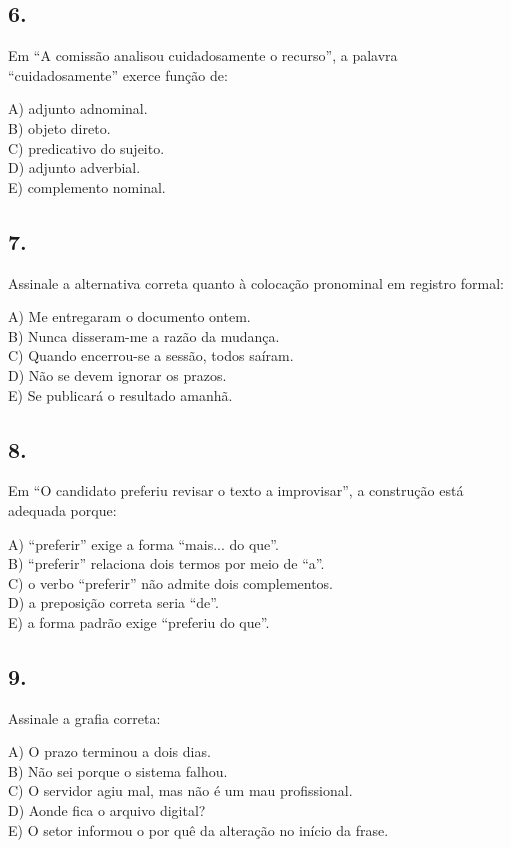 \documentclass[11pt,a4paper]{article}
\begin{document}
\subsection*{6.}

Em “A comissão analisou cuidadosamente o recurso”, a palavra “cuidadosamente” exerce função de:

A) adjunto adnominal. \\ B) objeto direto. \\ C) predicativo do sujeito. \\ D) adjunto adverbial. \\ E) complemento nominal.

\subsection*{7.}

Assinale a alternativa correta quanto à colocação pronominal em registro formal:

A) Me entregaram o documento ontem. \\ B) Nunca disseram-me a razão da mudança. \\ C) Quando encerrou-se a sessão, todos saíram. \\ D) Não se devem ignorar os prazos. \\ E) Se publicará o resultado amanhã.

\subsection*{8.}

Em “O candidato preferiu revisar o texto a improvisar”, a construção está adequada porque:

A) “preferir” exige a forma “mais... do que”. \\ B) “preferir” relaciona dois termos por meio de “a”. \\ C) o verbo “preferir” não admite dois complementos. \\ D) a preposição correta seria “de”. \\ E) a forma padrão exige “preferiu do que”.

\subsection*{9.}

Assinale a grafia correta:

A) O prazo terminou a dois dias. \\ B) Não sei porque o sistema falhou. \\ C) O servidor agiu mal, mas não é um mau profissional. \\ D) Aonde fica o arquivo digital? \\ E) O setor informou o por quê da alteração no início da frase.
\end{document}
